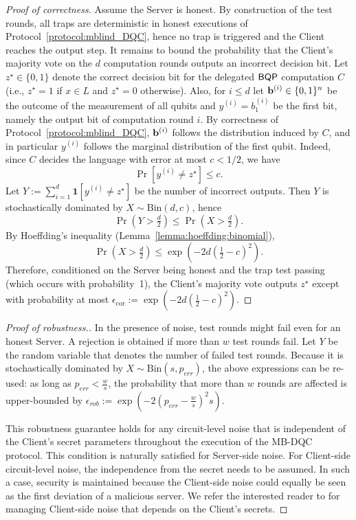 \begin{proof}[Proof of correctness]
    Assume the Server is honest. By construction of the test rounds, all traps are deterministic
    in honest executions of Protocol~\ref{protocol:mblind_DQC}, hence no trap is triggered and
    the Client reaches the output step.
    It remains to bound the probability that the Client's majority vote on the $d$ computation
    rounds outputs an incorrect decision bit. Let $z^\star \in \{0,1\}$ denote the correct
    decision bit for the delegated $\textsf{BQP}$ computation $C$ (i.e., $z^\star=1$ if
    $x\in L$ and $z^\star=0$ otherwise).
    Also, for $i\leq d$ let $\mathbf b^{(i)} \in \{0,1\}^n$ be the outcome of the measurement of all qubits and $y^{(i)} = b^{(i)}_1$ be the first bit, namely the output bit of computation round $i$.
    By correctness of Protocol~\ref{protocol:mblind_DQC},
    $\mathbf b^{(i)}$ follows the distribution induced by $C$, and in particular $y^{(i)}$ follows the marginal distribution of the first qubit.
    Indeed, since $C$ decides the language with error at most $c < 1/2$,
    we have
    \[
    \Pr[y^{(i)} \neq z^\star] \le c.
    \]
    Let $Y := \sum_{i=1}^d \mathbf 1[y^{(i)} \neq z^\star]$ be the number of incorrect outputs.
    Then $Y$ is stochastically dominated by $X\sim \mathrm{Bin}(d,c)$, hence
    \[
    \Pr\!\left(Y > \tfrac d2\right) \le \Pr\!\left(X > \tfrac d2\right).
    \]
    By Hoeffding's inequality (Lemma~\ref{lemma:hoeffding:binomial}),
    \[
    \Pr\!\left(X > \tfrac d2\right)\le \exp\!\left(-2d\left(\tfrac12-c\right)^2\right).
    \]
    Therefore, conditioned on the Server being honest and the trap test passing (which occurs
    with probability~1), the Client's majority vote outputs $z^\star$ except with probability at
    most $\epsilon_{\mathrm{cor}} := \exp\!\left(-2d\left(\tfrac12-c\right)^2\right)$.
    \end{proof}

\begin{proof}[Proof of robustness.]
    In the presence of noise, test rounds might fail even for an honest Server. A rejection is obtained if more than  $w$ test rounds fail.
    Let $Y$ be the random variable that denotes the number of failed test rounds. Because it is stochastically dominated by $X\sim \mathrm{Bin}(s,p_{err})$, the above expressions can be re-used: as long as $p_{err}< \tfrac w s$, the probability that more than $w$ rounds are affected is upper-bounded by $\epsilon_{rob} :=\exp\!\left(-2(p_{err}-\tfrac w s)^2 s\right)$.

    This robustness guarantee holds for any circuit-level noise that is independent of the Client's secret parameters throughout the execution of the MB-DQC protocol. This condition is naturally satisfied for Server-side noise. For Client-side circuit-level noise, the independence from the secret needs to be assumed. In such a case, security is maintained because the Client-side noise could equally be seen as the first deviation of a malicious server. We refer the interested reader to \cite{KLMO25plugging} for managing Client-side noise that depends on the Client's secrets.

\end{proof}

